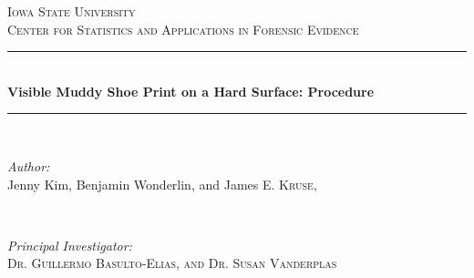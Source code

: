 \graphicspath{ {images/} }

\usepackage{hyperref}



\begin{titlepage}

\newcommand{\HRule}{\rule{\linewidth}{0.5mm}} %

\center %
 
\textsc{\LARGE Iowa State University}\\[1.5cm] %
\textsc{\large Center for Statistics and Applications in Forensic Evidence }\\[0.5cm] %


\HRule \\[0.4cm]
{ \huge \bfseries Visible Muddy Shoe Print on a Hard Surface: Procedure}\\[0.4cm] %
\HRule \\[1.5cm]
 
\begin{minipage}{0.4\textwidth}
\begin{flushleft} \large
\emph{Author:}\\
Jenny Kim, \newline Benjamin Wonderlin, and James \textsc{E. Kruse, } %
\end{flushleft}
\end{minipage}
~
\begin{minipage}{0.4\textwidth}
\begin{flushright} \large
\emph{Principal Investigator:} \\
 \textsc{Dr. Guillermo Basulto-Elias, and Dr. Susan Vanderplas } %
\end{flushright}
\end{minipage}\\[2cm]


\end{titlepage}
